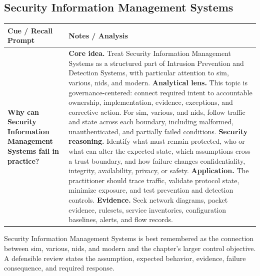 \documentclass[11pt]{article}
\newcommand{\CornellHeader}{%
\rowcolor{Navy}\color{white}\bfseries Cue / Recall Prompt & \color{white}\bfseries Notes / Analysis\\\hline}
\newcommand{\CornellRow}[2]{%
\cellcolor{CueGray}\RaggedRight\textbf{#1} & \RaggedRight #2\\\hline}
\begin{document}
\subsection*{Security Information Management Systems}
\begin{longtable}{>{\RaggedRight\arraybackslash}p{}|>{\RaggedRight\arraybackslash}p{}}
\CornellHeader
\CornellRow{Why can Security Information Management Systems fail in practice?}{\textbf{Core idea.} Treat Security Information Management Systems as a structured part of Intrusion Prevention and Detection Systems, with particular attention to sim, various, nids, and modern. \textbf{Analytical lens.} This topic is governance-centered: connect required intent to accountable ownership, implementation, evidence, exceptions, and corrective action. For sim, various, and nids, follow traffic and state across each boundary, including malformed, unauthenticated, and partially failed conditions. \textbf{Security reasoning.} Identify what must remain protected, who or what can alter the expected state, which assumptions cross a trust boundary, and how failure changes confidentiality, integrity, availability, privacy, or safety. \textbf{Application.} The practitioner should trace traffic, validate protocol state, minimize exposure, and test prevention and detection controls. \textbf{Evidence.} Seek network diagrams, packet evidence, rulesets, service inventories, configuration baselines, alerts, and flow records.}
\end{longtable}
\begin{topicsummary}
Security Information Management Systems is best remembered as the connection between sim, various, nids, and modern and the chapter's larger control objective. A defensible review states the assumption, expected behavior, evidence, failure consequence, and required response.
\end{topicsummary}
\end{document}
